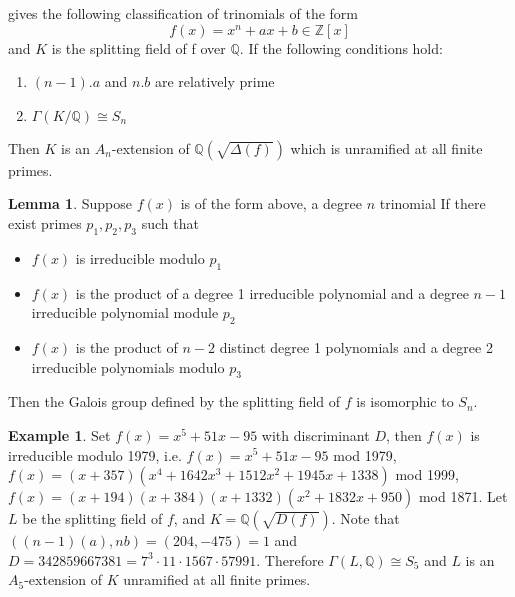 \documentclass[12pt]{extarticle}
\newcommand{\Q}{\mathbb{Q}}
\newcommand{\<}{\langle}
\renewcommand{\>}{\rangle}
\theoremstyle{definition}
\newtheorem*{example}{Example}
\newtheorem{lemma}{Lemma}
\begin{document}
\cite{YAMA1970} gives the following classification of trinomials of the form 
\begin{equation}
    f(x) = x^n+ax+b \in \mathbb{Z}[x]
\end{equation}and $K$ is the splitting field of f over $\Q$.
If the following conditions hold:
\begin{enumerate}
    \item $(n-1).a$ and $n.b$ are relatively prime 
    \item $\Gamma(K/\mathbb{Q}) \cong S_n$
\end{enumerate}\par
Then $K$ is an $A_n$-extension of $\Q\left( \sqrt{\Delta(f)}\right)$ which is unramified at all finite primes.
\begin{lemma}
Suppose $f(x)$ is of the form above, a degree $n$ trinomial If there exist primes $p_1,p_2,p_3$ such that \begin{itemize}
\item $f(x)$ is irreducible modulo $p_1$
\item $f(x)$ is the product of a degree 1 irreducible polynomial and a degree $n-1$ irreducible polynomial module $p_2$
\item $f(x)$ is the product of $n-2$ distinct degree 1 polynomials and a degree 2 irreducible polynomials modulo $p_3$
\end{itemize}
Then the Galois group defined by the splitting field of $f$ is isomorphic to $S_n$.
\end{lemma}
\begin{example}
Set $f(x)= x^5+51x-95$ with discriminant $D$, then $f(x)$ is irreducible modulo 1979, i.e. $f(x)= x^5+51x-95 $ mod 1979, 
$f(x)=(x + 357)(x^4 + 1642x^3 + 1512 x^2 + 1945x + 1338)$ mod 1999, $f(x)=(
x + 194)(x + 384)(x + 1332)(x^2 + 1832x + 950)$ mod 1871. Let $L$ be the splitting field of $f$, and $K = \Q(\sqrt{D(f)})$.    
Note that $((n-1)(a),nb) = (204,-475)=1$ and $D = 342859667381 = 7^3 \cdot 11 \cdot 1567 \cdot 57991$. Therefore $\Gamma(L,\Q) \cong S_5$ and $L$ is an $A_5$-extension of $K$ unramified at all finite primes.
\end{example}

\end{document}
